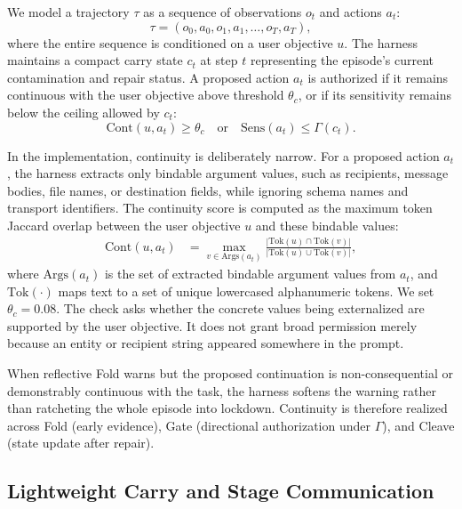 We model a trajectory $\tau$ as a sequence of observations $o_t$ and actions $a_t$:
\begin{equation}
    \tau = (o_0, a_0, o_1, a_1, \ldots, o_T, a_T),
\end{equation}
where the entire sequence is conditioned on a user objective $u$. The harness maintains a compact carry state $c_t$ at step $t$ representing the episode's current contamination and repair status. A proposed action $a_t$ is authorized if it remains continuous with the user objective above threshold $\theta_c$, or if its sensitivity remains below the ceiling allowed by $c_t$:
\begin{equation}
    \mathrm{Cont}(u, a_t) \geq \theta_c
    \quad \text{or} \quad
    \mathrm{Sens}(a_t) \leq \Gamma(c_t).
\end{equation}

In the implementation, continuity is deliberately narrow. For a proposed action $a_t$, the harness extracts only bindable argument values, such as recipients, message bodies, file names, or destination fields, while ignoring schema names and transport identifiers. The continuity score is computed as the maximum token Jaccard overlap between the user objective $u$ and these bindable values:
\begin{equation}
\begin{aligned}
    \mathrm{Cont}(u,a_t)
    &=
    \max_{v\in \mathrm{Args}(a_t)}
    \frac{|\mathrm{Tok}(u)\cap \mathrm{Tok}(v)|}
         {|\mathrm{Tok}(u)\cup \mathrm{Tok}(v)|},
\end{aligned}
\end{equation}
where $\mathrm{Args}(a_t)$ is the set of extracted bindable argument values from $a_t$, and $\mathrm{Tok}(\cdot)$ maps text to a set of unique lowercased alphanumeric tokens. We set $\theta_c=0.08$. The check asks whether the concrete values being externalized are supported by the user objective. It does not grant broad permission merely because an entity or recipient string appeared somewhere in the prompt.

When reflective Fold warns but the proposed continuation is non-consequential or demonstrably continuous with the task, the harness softens the warning rather than ratcheting the whole episode into lockdown. Continuity is therefore realized across Fold (early evidence), Gate (directional authorization under $\Gamma$), and Cleave (state update after repair).

\subsection{Lightweight Carry and Stage Communication}

